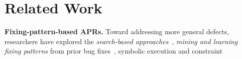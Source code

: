 \section{Related Work}
\label{related:sec}


{\bf Fixing-pattern-based APRs.} 
Toward addressing more general defects, researchers have
explored the {\em search-based
  approaches}~\cite{le2011genprog,qi2014strength,LeGoues-icse12,martinez2016astor},
{\em mining and learning fixing patterns} from prior bug
fixes~\cite{le2016history,
  kim2013automatic,nguyen2013semfix,liu2019avatar,tbar-issta19},
symbolic execution and constraint

